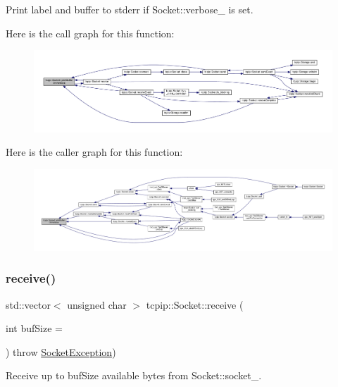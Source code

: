 Print {\ttfamily label} and {\ttfamily buffer} to stderr if Socket\+::verbose\+\_\+ is set. 

Here is the call graph for this function\+:
\nopagebreak
\begin{figure}[H]
\begin{center}
\leavevmode
\includegraphics[width=350pt]{classtcpip_1_1_socket_a08e08cdc00fd69a51e2cdd8ecb22d1e0_cgraph}
\end{center}
\end{figure}
Here is the caller graph for this function\+:
\nopagebreak
\begin{figure}[H]
\begin{center}
\leavevmode
\includegraphics[width=350pt]{classtcpip_1_1_socket_a08e08cdc00fd69a51e2cdd8ecb22d1e0_icgraph}
\end{center}
\end{figure}
\mbox{\label{classtcpip_1_1_socket_a1da162e961fee9f1a1450df9700fd468}} 
\subsubsection{\texorpdfstring{receive()}{receive()}}
{\footnotesize\ttfamily std\+::vector$<$ unsigned char $>$ tcpip\+::\+Socket\+::receive (\begin{DoxyParamCaption}\item[{int}]{buf\+Size = {} }\end{DoxyParamCaption}) throw  \hyperlink{classtcpip_1_1_socket_exception}{Socket\+Exception}) }



Receive up to {\ttfamily buf\+Size} available bytes from Socket\+::socket\+\_\+. 

